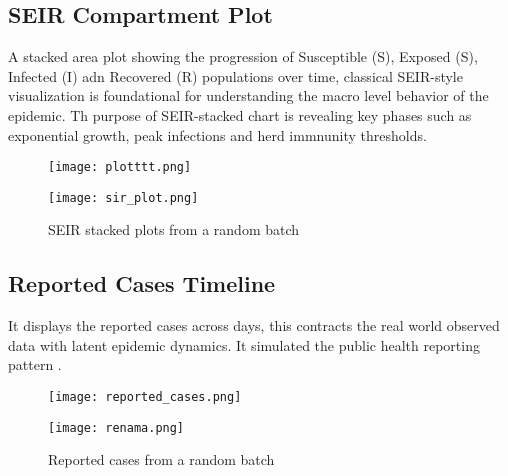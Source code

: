 \documentclass[11pt,a4paper]{article}
\theoremstyle{remark}\newtheorem{remark}{Remark}
\begin{document}
\subsection{SEIR Compartment Plot}
A stacked area plot showing the progression of Susceptible (S), Exposed (S), Infected (I) adn Recovered (R) populations over time, classical SEIR-style visualization is foundational for understanding the macro level behavior of the epidemic. Th purpose of SEIR-stacked chart is revealing key phases such as exponential growth, peak infections and herd immnunity thresholds. 
\begin{figure}[H]
    \begin{minipage}{0.49\linewidth}
        \flushleft
        \texttt{[image: plotttt.png]}
    \end{minipage}
    \hfill
    \begin{minipage}{0.49\linewidth}
        \flushright
        \texttt{[image: sir\_plot.png]}
    \end{minipage}
    
    \caption{SEIR stacked plots from a random batch}
    \label{fig:seir-side-by-side}
\end{figure}


\subsection{Reported Cases Timeline}
It displays the reported cases across days, this contracts the real world observed data with latent epidemic dynamics. It simulated the public health reporting pattern .
\begin{figure}[H]
    \begin{minipage}{0.49\linewidth}
        \flushleft
        \texttt{[image: reported\_cases.png]}
    \end{minipage}
    \hfill
    \begin{minipage}{0.49\linewidth}
        \flushright
        \texttt{[image: renama.png]}
    \end{minipage}
    
    \caption{Reported cases from a random batch}
    \label{fig:seir-side-by-side}
\end{figure}
\end{document}
